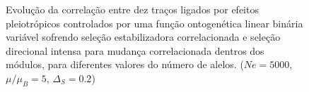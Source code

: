 \begin{center}
\begin{figure}[htbp]
\end{figure}
\begin{figure}[htbp]
  \caption{Evolução da correlação entre dez traços ligados por efeitos
  pleiotrópicos controlados por uma função ontogenética linear binária
  variável sofrendo seleção estabilizadora correlacionada e seleção
  direcional intensa para mudança correlacionada dentros dos módulos,
  para diferentes valores do número de alelos. ($Ne=5000$, $\mu/\mu_B=5$, $\Delta_S=0.2$)}
  \label{MBLR}
\end{figure}
\end{center}

